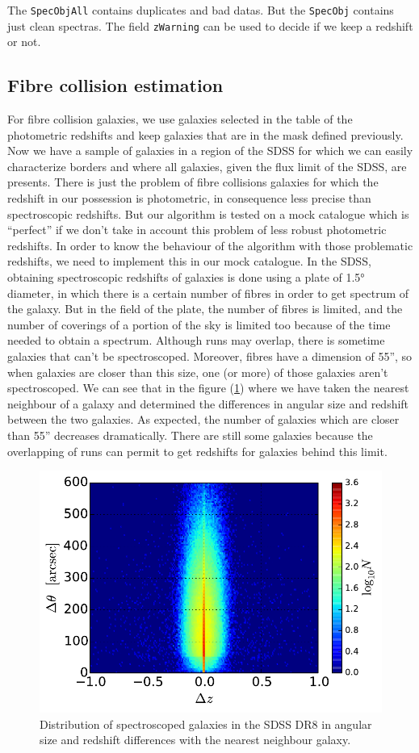 The \texttt{SpecObjAll} contains duplicates and bad datas. But the
\texttt{SpecObj} contains just clean spectras. The field \texttt{zWarning}
can be used to decide if we keep a redshift or not.
%
\subsection{Fibre collision estimation}
%
For fibre collision galaxies, we use galaxies selected in the table of the
photometric redshifts and keep galaxies that are in the mask defined
previously. Now we have a sample of galaxies in a region of the SDSS for which
we can easily characterize borders and where all galaxies, given the flux limit
of the SDSS, are presents. There is just the problem of fibre collisions
galaxies for which the redshift in our possession is photometric, in
consequence less precise than spectroscopic redshifts. But our algorithm is
tested on a mock catalogue which is ``perfect'' if we don't take in account
this problem of less robust photometric redshifts. In order to know the
behaviour of the algorithm with those problematic redshifts, we need to
implement this in our mock catalogue.
%
In the SDSS, obtaining spectroscopic redshifts of galaxies is done using a
plate of 1.5° diameter, in which there is a certain number of fibres in
order to get spectrum of the galaxy. But in the field of the plate, the number
of fibres is limited, and the number of coverings of a portion of the sky is
limited too because of the time needed to obtain a spectrum. Although runs may
overlap, there is sometime galaxies that can't be spectroscoped. Moreover,
fibres have a dimension of 55'', so when galaxies are closer than this
size, one (or more) of those galaxies aren't spectroscoped. We can see that in
the figure (\ref{fig:angreddist}) where we have taken the nearest neighbour of a
galaxy and determined the differences in angular size and redshift between the
two galaxies. As expected, the number of galaxies which are closer than
55'' decreases dramatically. There are still some galaxies because the
overlapping of runs can permit to get redshifts for galaxies behind this limit.
\begin{figure}[ht]
    \centering
    \includegraphics[width=0.6\linewidth]{figures/sdss/plane.pdf}
    \caption{\footnotesize{}Distribution of spectroscoped galaxies in the SDSS DR8 in angular size and redshift differences with
    the nearest neighbour galaxy.}
\label{fig:angreddist}
\end{figure}

